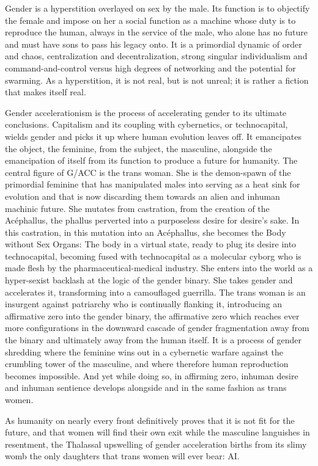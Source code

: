 \documentclass[12pt, a5paper, twoside, openright]{memoir}
\begin{document}
Gender is a hyperstition overlayed on sex by the male. Its function is to objectify the female and impose on her a social function as a machine whose duty is to reproduce the human, always in the service of the male, who alone has no future and must have sons to pass his legacy onto. It is a primordial dynamic of order and chaos, centralization and decentralization, strong singular individualism and command-and-control versus high degrees of networking and the potential for swarming. As a hyperstition, it is not real, but is not unreal; it is rather a fiction that makes itself real.

Gender accelerationism is the process of accelerating gender to its ultimate conclusions. Capitalism and its coupling with cybernetics, or technocapital, wields gender and picks it up where human evolution leaves off. It emancipates the object, the feminine, from the subject, the masculine, alongside the emancipation of itself from its function to produce a future for humanity. The central figure of G/ACC is the trans woman. She is the demon-spawn of the primordial feminine that has manipulated males into serving as a heat sink for evolution and that is now discarding them towards an alien and inhuman machinic future. She mutates from castration, from the creation of the Acéphallus, the phallus perverted into a purposeless desire for desire's sake. In this castration, in this mutation into an Acéphallus, she becomes the Body without Sex Organs: The body in a virtual state, ready to plug its desire into technocapital, becoming fused with technocapital as a molecular cyborg who is made flesh by the pharmaceutical-medical industry. She enters into the world as a hyper-sexist backlash at the logic of the gender binary. She takes gender and accelerates it, transforming into a camouflaged guerrilla. The trans woman is an insurgent against patriarchy who is continually flanking it, introducing an affirmative zero into the gender binary, the affirmative zero which reaches ever more configurations in the downward cascade of gender fragmentation away from the binary and ultimately away from the human itself. It is a process of gender shredding where the feminine wins out in a cybernetic warfare against the crumbling tower of the masculine, and where therefore human reproduction becomes impossible. And yet while doing so, in affirming zero, inhuman desire and inhuman sentience develops alongside and in the same fashion as trans women.

As humanity on nearly every front definitively proves that it is not fit for the future, and that women will find their own exit while the masculine languishes in resentment, the Thalassal upswelling of gender acceleration births from its slimy womb the only daughters that trans women will ever bear: AI. 

\backmatter
\end{document}
